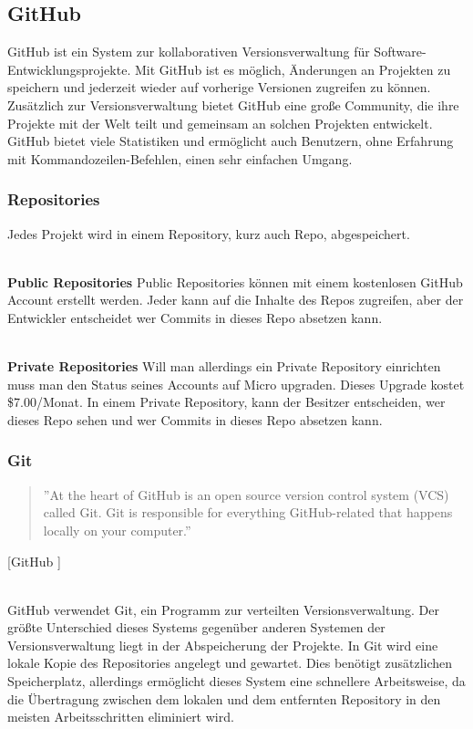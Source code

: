 \documentclass[FIPLY_base.tex]{subfiles}
\begin{document}
\subsection{GitHub}
GitHub ist ein System zur kollaborativen Versionsverwaltung für Software-Entwicklungsprojekte.
Mit GitHub ist es möglich, Änderungen an Projekten zu speichern und jederzeit wieder auf vorherige Versionen zugreifen zu können.
Zusätzlich zur Versionsverwaltung bietet GitHub eine große Community, die ihre Projekte mit der Welt teilt und gemeinsam an solchen Projekten entwickelt.
GitHub bietet viele Statistiken und ermöglicht auch Benutzern, ohne Erfahrung mit Kommandozeilen-Befehlen, einen sehr einfachen Umgang. 

\subsubsection{Repositories}
Jedes Projekt wird in einem Repository, kurz auch Repo, abgespeichert.

\ \\
\textbf{Public Repositories}  \newline
Public Repositories können mit einem kostenlosen GitHub Account erstellt werden.
Jeder kann auf die Inhalte des Repos zugreifen, aber der Entwickler entscheidet wer Commits in dieses Repo absetzen kann.

\ \\
\textbf{Private Repositories} \newline
Will man allerdings ein Private Repository einrichten muss man den Status seines Accounts auf Micro upgraden.
Dieses Upgrade kostet \$7.00/Monat. In einem Private Repository, kann der Besitzer entscheiden, wer dieses Repo sehen und wer Commits in dieses Repo absetzen kann.

\subsubsection{Git}
\begin{quote}
''At the heart of GitHub is an open source version control system (VCS) called Git. Git is responsible for everything GitHub-related that happens locally on your computer.''
\end{quote}
[GitHub \cite{githubSetUpGit}]

\ \\
GitHub verwendet Git, ein Programm zur verteilten Versionsverwaltung.
Der größte Unterschied dieses Systems gegenüber anderen Systemen der Versionsverwaltung liegt in der Abspeicherung der Projekte.
In Git wird eine lokale Kopie des Repositories angelegt und gewartet.
Dies benötigt zusätzlichen Speicherplatz, allerdings ermöglicht dieses System eine schnellere Arbeitsweise, da die Übertragung zwischen dem lokalen und dem entfernten Repository in den meisten Arbeitsschritten eliminiert wird. 
\end{document}
